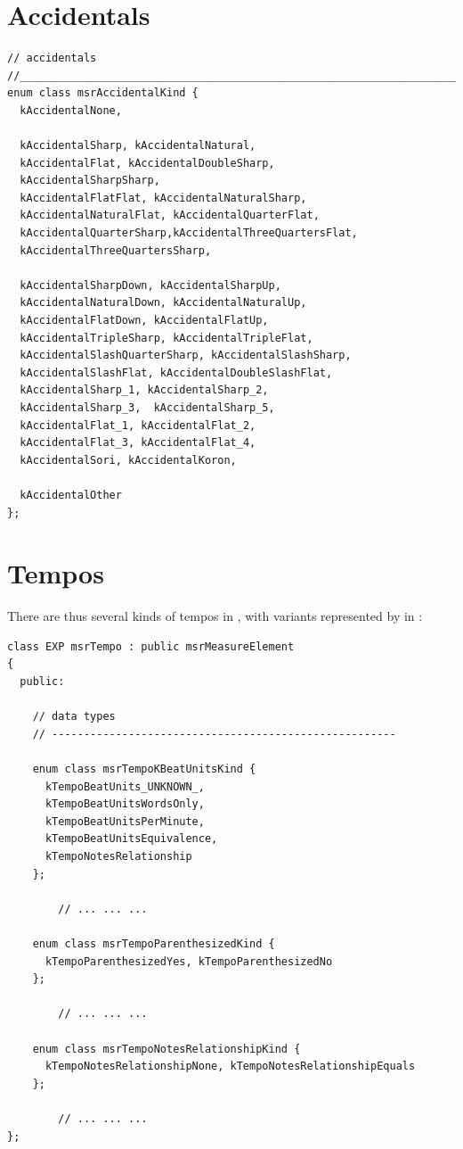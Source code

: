 \section{Accidentals}\label{Accidentals}

\begin{lstlisting}[language=CPlusPlus]
// accidentals
//______________________________________________________________________________
enum class msrAccidentalKind {
  kAccidentalNone,

  kAccidentalSharp, kAccidentalNatural,
  kAccidentalFlat, kAccidentalDoubleSharp,
  kAccidentalSharpSharp,
  kAccidentalFlatFlat, kAccidentalNaturalSharp,
  kAccidentalNaturalFlat, kAccidentalQuarterFlat,
  kAccidentalQuarterSharp,kAccidentalThreeQuartersFlat,
  kAccidentalThreeQuartersSharp,

  kAccidentalSharpDown, kAccidentalSharpUp,
  kAccidentalNaturalDown, kAccidentalNaturalUp,
  kAccidentalFlatDown, kAccidentalFlatUp,
  kAccidentalTripleSharp, kAccidentalTripleFlat,
  kAccidentalSlashQuarterSharp, kAccidentalSlashSharp,
  kAccidentalSlashFlat, kAccidentalDoubleSlashFlat,
  kAccidentalSharp_1, kAccidentalSharp_2,
  kAccidentalSharp_3,  kAccidentalSharp_5,
  kAccidentalFlat_1, kAccidentalFlat_2,
  kAccidentalFlat_3, kAccidentalFlat_4,
  kAccidentalSori, kAccidentalKoron,

  kAccidentalOther
};
\end{lstlisting}


\section{Tempos}\label{Tempos}

There are thus several kinds of tempos in \msrRepr, with variants represented by  in :
\begin{lstlisting}[language=CPlusPlus]
class EXP msrTempo : public msrMeasureElement
{
  public:

    // data types
    // ------------------------------------------------------

    enum class msrTempoKBeatUnitsKind {
      kTempoBeatUnits_UNKNOWN_,
      kTempoBeatUnitsWordsOnly,
      kTempoBeatUnitsPerMinute,
      kTempoBeatUnitsEquivalence,
      kTempoNotesRelationship
    };

		// ... ... ...

    enum class msrTempoParenthesizedKind {
      kTempoParenthesizedYes, kTempoParenthesizedNo
    };

		// ... ... ...

    enum class msrTempoNotesRelationshipKind {
      kTempoNotesRelationshipNone, kTempoNotesRelationshipEquals
    };

		// ... ... ...
};
\end{lstlisting}


